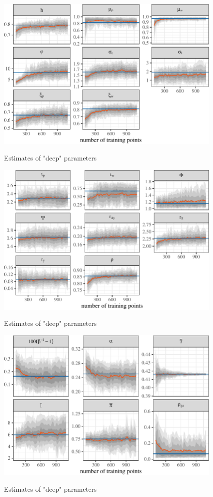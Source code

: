 \documentclass[11pt]{article}
\begin{document}
\begin{figure}[t]
{\centering \includegraphics{gfx/deep1-1}  }
\caption{Estimates of "deep" parameters}\label{fig:deep1}
\end{figure}

\begin{figure}[t]
{\centering \includegraphics{gfx/deep2-1} }
\caption{Estimates of "deep" parameters}\label{fig:deep2}
\end{figure}

\begin{figure}[t]
{\centering \includegraphics{gfx/deep3-1} }
\caption{Estimates of "deep" parameters}\label{fig:deep3}
\end{figure}
\end{document}
